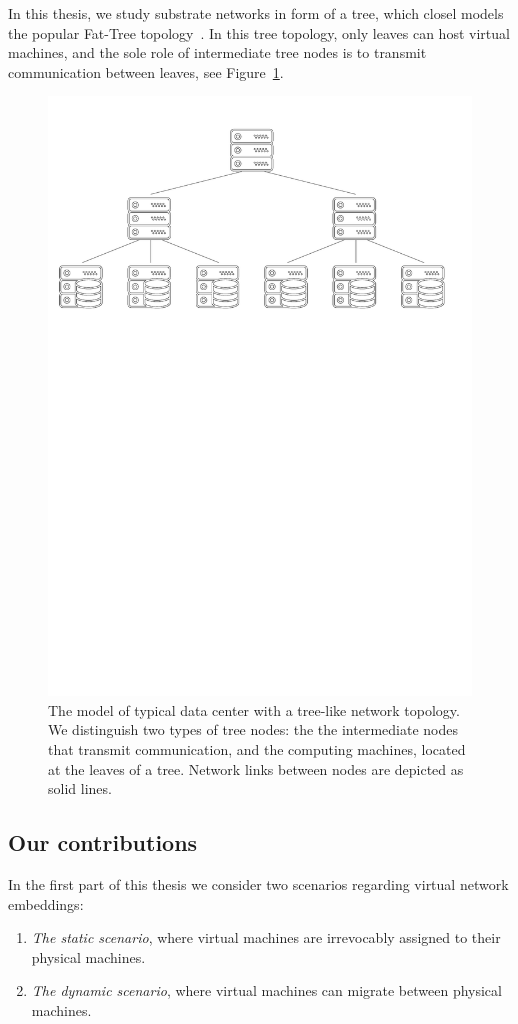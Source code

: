 In this thesis, we study substrate networks in form of a tree, which closel models the popular Fat-Tree topology~\cite{fat-trees}.
In this tree topology, only leaves can host virtual machines, and the sole role of intermediate tree nodes is to transmit communication between leaves, see Figure~\ref{fig:tree-topology}.


\begin{figure}[h]
\centering
\includegraphics[width=0.79\columnwidth]{figs/tree-topology.pdf}
\caption{The model of typical data center with a tree-like network topology. We distinguish two types of tree nodes: the the intermediate nodes that transmit communication, and the computing machines, located at the leaves of a tree. Network links between nodes are depicted as solid lines.}\label{fig:tree-topology}
\vspace{-1em}
\end{figure}


\subsection{Our contributions}

In the first part of this thesis we consider two scenarios regarding virtual network embeddings:
\begin{enumerate}
  \item \emph{The static scenario}, where virtual machines are irrevocably assigned to their physical machines.
  \item \emph{The dynamic scenario}, where virtual machines can migrate between physical machines.
\end{enumerate}

